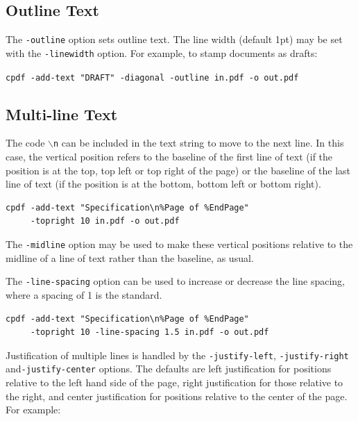 \documentclass{book}
\begin{document}
\subsection{Outline Text}

  The \texttt{-outline} option sets outline text. The line width (default 1pt)
  may be set with the \texttt{-linewidth} option. For example, to stamp
  documents as drafts:

  \begin{framed}
    \noindent\small\verb!cpdf -add-text "DRAFT" -diagonal -outline in.pdf -o out.pdf!
    
  \end{framed}

\subsection{Multi-line Text}

The code \texttt{$\backslash$n} can be included in the text string to move to
the next line. In this case, the vertical position refers to the baseline of
the first line of text (if the position is at the top, top left or top right of
the page) or the baseline of the last line of text (if the position is at the
bottom, bottom left or bottom right).

  \begin{framed}
    \noindent\small\begin{verbatim}cpdf -add-text "Specification\n%Page of %EndPage"
     -topright 10 in.pdf -o out.pdf\end{verbatim}
  \end{framed}

\noindent The \texttt{-midline} option may be used to make these vertical positions
relative to the midline of a line of text rather than the baseline, as usual.

The \texttt{-line-spacing} option can be used to increase or decrease the line
spacing, where a spacing of 1 is the standard.

  \begin{framed}
    \noindent\small\begin{verbatim}cpdf -add-text "Specification\n%Page of %EndPage"
     -topright 10 -line-spacing 1.5 in.pdf -o out.pdf\end{verbatim}
  \end{framed}

\noindent Justification of multiple lines is handled by the \texttt{-justify-left}, 
\texttt{-justify-right} and\linebreak \texttt{-justify-center} options. The defaults are
left justification for positions relative to the left hand side of the page,
right justification for those relative to the right, and center justification
for positions relative to the center of the page. For example:
\end{document}
